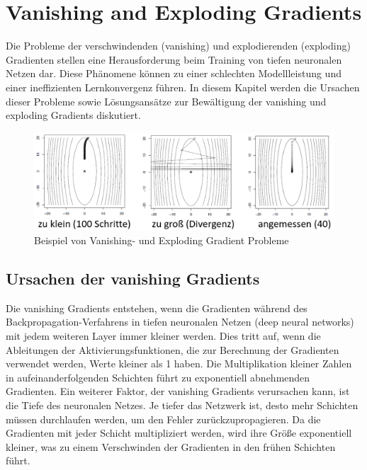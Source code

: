 \section{Vanishing and Exploding Gradients}

    Die Probleme der verschwindenden (vanishing) und explodierenden (exploding) Gradienten stellen eine Herausforderung beim Training von tiefen neuronalen Netzen dar. 
    Diese Phänomene können zu einer schlechten Modellleistung und einer ineffizienten Lernkonvergenz führen. 
    In diesem Kapitel werden die Ursachen dieser Probleme sowie Lösungsansätze zur Bewältigung der vanishing und exploding Gradients diskutiert.

\begin{figure}[h]
    \centering
    \includegraphics[width=\textwidth]{img/sgd_KI_vorlesung.png}
    \caption{Beispiel von Vanishing- und Exploding Gradient Probleme}
    \label{fig:gradient_descent_exploding_vanishing}
\end{figure}

\subsection{Ursachen der vanishing Gradients}

    Die vanishing Gradients entstehen, wenn die Gradienten während des Backpropagation-Verfahrens in tiefen neuronalen Netzen (deep neural networks) mit jedem weiteren Layer immer kleiner werden. 
    Dies tritt auf, wenn die Ableitungen der Aktivierungsfunktionen, die zur Berechnung der Gradienten verwendet werden, Werte kleiner als 1 haben.
    Die Multiplikation kleiner Zahlen in aufeinanderfolgenden Schichten führt zu exponentiell abnehmenden Gradienten.
    Ein weiterer Faktor, der vanishing Gradients verursachen kann, ist die Tiefe des neuronalen Netzes. 
    Je tiefer das Netzwerk ist, desto mehr Schichten müssen durchlaufen werden, um den Fehler zurückzupropagieren. 
    Da die Gradienten mit jeder Schicht multipliziert werden, wird ihre Größe exponentiell kleiner, was zu einem Verschwinden der Gradienten in den frühen Schichten führt.

